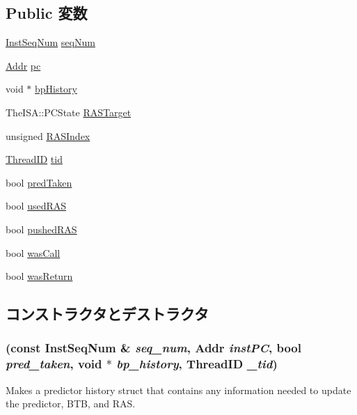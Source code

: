 \subsection*{Public 変数}
\begin{DoxyCompactItemize}
\item 
\hyperlink{inst__seq_8hh_a258d93d98edaedee089435c19ea2ea2e}{InstSeqNum} \hyperlink{structBPredUnit_1_1PredictorHistory_af9da73f56d2d0e7fd5009b70c4cf3542}{seqNum}
\item 
\hyperlink{base_2types_8hh_af1bb03d6a4ee096394a6749f0a169232}{Addr} \hyperlink{structBPredUnit_1_1PredictorHistory_afed6bf9f08aaa7445161a391a719b7e4}{pc}
\item 
void $\ast$ \hyperlink{structBPredUnit_1_1PredictorHistory_af77971b0f4cc17c0e855b92b1a309983}{bpHistory}
\item 
TheISA::PCState \hyperlink{structBPredUnit_1_1PredictorHistory_a45fedf51b9f9857a0c4ee07d3967f6cc}{RASTarget}
\item 
unsigned \hyperlink{structBPredUnit_1_1PredictorHistory_a37b18bd15c135c050f48d643ba6d1264}{RASIndex}
\item 
\hyperlink{base_2types_8hh_ab39b1a4f9dad884694c7a74ed69e6a6b}{ThreadID} \hyperlink{structBPredUnit_1_1PredictorHistory_aa508770268ee4ceaf16054b9e0be0e17}{tid}
\item 
bool \hyperlink{structBPredUnit_1_1PredictorHistory_a27392b4b7d6c2f92585d4a3a4bae5a7b}{predTaken}
\item 
bool \hyperlink{structBPredUnit_1_1PredictorHistory_a7238cdd6213db4fe8d76843a479b6690}{usedRAS}
\item 
bool \hyperlink{structBPredUnit_1_1PredictorHistory_aeb0915a8ec4bc79f84faf82333fcbca9}{pushedRAS}
\item 
bool \hyperlink{structBPredUnit_1_1PredictorHistory_acd950229e5cd2e16830cbe2178f29d36}{wasCall}
\item 
bool \hyperlink{structBPredUnit_1_1PredictorHistory_a8b97fcb129848133145dfcadafbb05dd}{wasReturn}
\end{DoxyCompactItemize}


\subsection{コンストラクタとデストラクタ}
\hypertarget{structBPredUnit_1_1PredictorHistory_a9ae4f18c70a18a02c7c5866687424206}{
\subsubsection[{PredictorHistory}]{ (const {\bf InstSeqNum} \& {\em seq\_\-num}, \/  {\bf Addr} {\em instPC}, \/  bool {\em pred\_\-taken}, \/  void $\ast$ {\em bp\_\-history}, \/  {\bf ThreadID} {\em \_\-tid})}}
\label{structBPredUnit_1_1PredictorHistory_a9ae4f18c70a18a02c7c5866687424206}
Makes a predictor history struct that contains any information needed to update the predictor, BTB, and RAS. 


